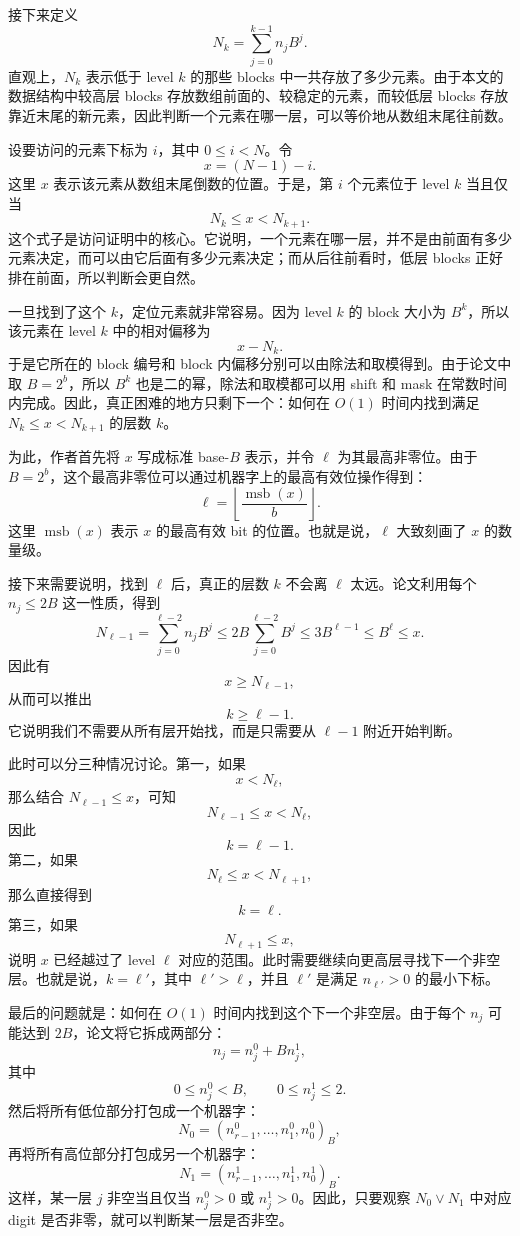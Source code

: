 \documentclass[12pt,a4paper]{article}
\begin{document}
接下来定义
\[
N_k=\sum_{j=0}^{k-1}n_jB^j.
\]
直观上，$N_k$ 表示低于 level $k$ 的那些 blocks 中一共存放了多少元素。由于本文的数据结构中较高层 blocks 存放数组前面的、较稳定的元素，而较低层 blocks 存放靠近末尾的新元素，因此判断一个元素在哪一层，可以等价地从数组末尾往前数。

设要访问的元素下标为 $i$，其中 $0\le i<N$。令
\[
x=(N-1)-i.
\]
这里 $x$ 表示该元素从数组末尾倒数的位置。于是，第 $i$ 个元素位于 level $k$ 当且仅当
\[
N_k\le x<N_{k+1}.
\]
这个式子是访问证明中的核心。它说明，一个元素在哪一层，并不是由前面有多少元素决定，而可以由它后面有多少元素决定；而从后往前看时，低层 blocks 正好排在前面，所以判断会更自然。

一旦找到了这个 $k$，定位元素就非常容易。因为 level $k$ 的 block 大小为 $B^k$，所以该元素在 level $k$ 中的相对偏移为
\[
x-N_k.
\]
于是它所在的 block 编号和 block 内偏移分别可以由除法和取模得到。由于论文中取 $B=2^b$，所以 $B^k$ 也是二的幂，除法和取模都可以用 shift 和 mask 在常数时间内完成。因此，真正困难的地方只剩下一个：如何在 $O(1)$ 时间内找到满足 $N_k\le x<N_{k+1}$ 的层数 $k$。

为此，作者首先将 $x$ 写成标准 base-$B$ 表示，并令 $\ell$ 为其最高非零位。由于 $B=2^b$，这个最高非零位可以通过机器字上的最高有效位操作得到：
\[
\ell=\left\lfloor \frac{\operatorname{msb}(x)}{b}\right\rfloor.
\]
这里 $\operatorname{msb}(x)$ 表示 $x$ 的最高有效 bit 的位置。也就是说，$\ell$ 大致刻画了 $x$ 的数量级。

接下来需要说明，找到 $\ell$ 后，真正的层数 $k$ 不会离 $\ell$ 太远。论文利用每个 $n_j\le 2B$ 这一性质，得到
\[
N_{\ell-1}
=
\sum_{j=0}^{\ell-2} n_jB^j
\le
2B\sum_{j=0}^{\ell-2}B^j
\le
3B^{\ell-1}
\le
B^\ell
\le
x.
\]
因此有
\[
x\ge N_{\ell-1},
\]
从而可以推出
\[
k\ge \ell-1.
\]
它说明我们不需要从所有层开始找，而是只需要从 $\ell-1$ 附近开始判断。

此时可以分三种情况讨论。第一，如果
\[
x<N_\ell,
\]
那么结合 $N_{\ell-1}\le x$，可知
\[
N_{\ell-1}\le x<N_\ell,
\]
因此
\[
k=\ell-1.
\]
第二，如果
\[
N_\ell\le x<N_{\ell+1},
\]
那么直接得到
\[
k=\ell.
\]
第三，如果
\[
N_{\ell+1}\le x,
\]
说明 $x$ 已经越过了 level $\ell$ 对应的范围。此时需要继续向更高层寻找下一个非空层。也就是说，$k=\ell'$，其中 $\ell'>\ell$，并且 $\ell'$ 是满足 $n_{\ell'}>0$ 的最小下标。

最后的问题就是：如何在 $O(1)$ 时间内找到这个下一个非空层。由于每个 $n_j$ 可能达到 $2B$，论文将它拆成两部分：
\[
n_j=n_j^0+Bn_j^1,
\]
其中
\[
0\le n_j^0<B,\qquad 0\le n_j^1\le 2.
\]
然后将所有低位部分打包成一个机器字：
\[
N_0=(n_{r-1}^0,\ldots,n_1^0,n_0^0)_B,
\]
再将所有高位部分打包成另一个机器字：
\[
N_1=(n_{r-1}^1,\ldots,n_1^1,n_0^1)_B.
\]
这样，某一层 $j$ 非空当且仅当 $n_j^0>0$ 或 $n_j^1>0$。因此，只要观察 $N_0\vee N_1$ 中对应 digit 是否非零，就可以判断某一层是否非空。
\end{document}
